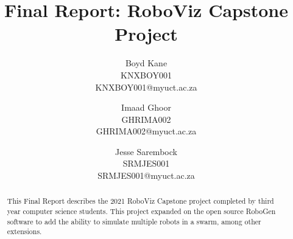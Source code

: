 \documentclass[11pt,a4paper]{article}
\begin{document}
\title{Final Report: RoboViz Capstone Project} \date{}
\author{Boyd Kane\\KNXBOY001\\KNXBOY001@myuct.ac.za
\and Imaad Ghoor\\GHRIMA002\\GHRIMA002@myuct.ac.za
\and Jesse Sarembock\\SRMJES001\\SRMJES001@myuct.ac.za}

\chead{}
\lfoot{}
\cfoot{\thepage}
\rfoot{}
\renewcommand{\headrulewidth}{0.0pt}

\maketitle
\thispagestyle{plain}

\begin{abstract}
    This Final Report describes the 2021 RoboViz Capstone project completed by
    third year computer science students. This project expanded on the open
    source RoboGen software to add the ability to simulate multiple robots in a
    swarm, among other extensions.
\end{abstract}

%
%
%
%
%
\end{document}

